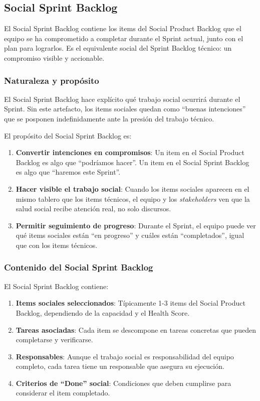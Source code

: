 \subsection{Social Sprint Backlog}

El Social Sprint Backlog contiene los items del Social Product Backlog que el equipo se ha comprometido a completar durante el Sprint actual, junto con el plan para lograrlos. Es el equivalente social del Sprint Backlog técnico: un compromiso visible y accionable.

\subsubsection{Naturaleza y propósito}

El Social Sprint Backlog hace explícito qué trabajo social ocurrirá durante el Sprint. Sin este artefacto, los items sociales quedan como ``buenas intenciones'' que se posponen indefinidamente ante la presión del trabajo técnico.

El propósito del Social Sprint Backlog es:

\begin{enumerate}
    \item \textbf{Convertir intenciones en compromisos}: Un item en el Social Product Backlog es algo que ``podríamos hacer''. Un item en el Social Sprint Backlog es algo que ``haremos este Sprint''.
    \item \textbf{Hacer visible el trabajo social}: Cuando los items sociales aparecen en el mismo tablero que los items técnicos, el equipo y los \textit{stakeholders} ven que la salud social recibe atención real, no solo discursos.
    \item \textbf{Permitir seguimiento de progreso}: Durante el Sprint, el equipo puede ver qué items sociales están ``en progreso'' y cuáles están ``completados'', igual que con los items técnicos.
\end{enumerate}

\subsubsection{Contenido del Social Sprint Backlog}
El Social Sprint Backlog contiene:

\begin{enumerate}
    \item \textbf{Items sociales seleccionados}: Típicamente 1-3 items del Social Product Backlog, dependiendo de la capacidad y el Health Score.
    \item \textbf{Tareas asociadas}: Cada item se descompone en tareas concretas que pueden completarse y verificarse.
    \item \textbf{Responsables}: Aunque el trabajo social es responsabilidad del equipo completo, cada tarea tiene un responsable que asegura su ejecución.
    \item \textbf{Criterios de ``Done'' social}: Condiciones que deben cumplirse para considerar el item completado.
\end{enumerate}

